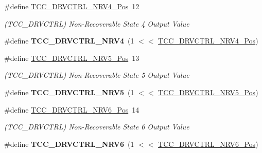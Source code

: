 \begin{DoxyCompactItemize}
\item 
\hypertarget{group___s_a_m_l21___t_c_c_ga3dd9b9c6aa7eabfb0915c9d8ece7ba8a}{}\#define \hyperlink{group___s_a_m_l21___t_c_c_ga3dd9b9c6aa7eabfb0915c9d8ece7ba8a}{T\+C\+C\+\_\+\+D\+R\+V\+C\+T\+R\+L\+\_\+\+N\+R\+V4\+\_\+\+Pos}~12\label{group___s_a_m_l21___t_c_c_ga3dd9b9c6aa7eabfb0915c9d8ece7ba8a}

\begin{DoxyCompactList}\small\item\em (T\+C\+C\+\_\+\+D\+R\+V\+C\+T\+R\+L) Non-\/\+Recoverable State 4 Output Value \end{DoxyCompactList}\item 
\hypertarget{group___s_a_m_l21___t_c_c_ga869b95683d7a2723f8b058ae3cce09b5}{}\#define {\bfseries T\+C\+C\+\_\+\+D\+R\+V\+C\+T\+R\+L\+\_\+\+N\+R\+V4}~(1 $<$$<$ \hyperlink{group___s_a_m_l21___t_c_c_ga3dd9b9c6aa7eabfb0915c9d8ece7ba8a}{T\+C\+C\+\_\+\+D\+R\+V\+C\+T\+R\+L\+\_\+\+N\+R\+V4\+\_\+\+Pos})\label{group___s_a_m_l21___t_c_c_ga869b95683d7a2723f8b058ae3cce09b5}

\item 
\hypertarget{group___s_a_m_l21___t_c_c_gae4467ffcf7ae1223a244a170318411f7}{}\#define \hyperlink{group___s_a_m_l21___t_c_c_gae4467ffcf7ae1223a244a170318411f7}{T\+C\+C\+\_\+\+D\+R\+V\+C\+T\+R\+L\+\_\+\+N\+R\+V5\+\_\+\+Pos}~13\label{group___s_a_m_l21___t_c_c_gae4467ffcf7ae1223a244a170318411f7}

\begin{DoxyCompactList}\small\item\em (T\+C\+C\+\_\+\+D\+R\+V\+C\+T\+R\+L) Non-\/\+Recoverable State 5 Output Value \end{DoxyCompactList}\item 
\hypertarget{group___s_a_m_l21___t_c_c_ga5a7ca6bd387ee52b84da36c2fe1b02c8}{}\#define {\bfseries T\+C\+C\+\_\+\+D\+R\+V\+C\+T\+R\+L\+\_\+\+N\+R\+V5}~(1 $<$$<$ \hyperlink{group___s_a_m_l21___t_c_c_gae4467ffcf7ae1223a244a170318411f7}{T\+C\+C\+\_\+\+D\+R\+V\+C\+T\+R\+L\+\_\+\+N\+R\+V5\+\_\+\+Pos})\label{group___s_a_m_l21___t_c_c_ga5a7ca6bd387ee52b84da36c2fe1b02c8}

\item 
\hypertarget{group___s_a_m_l21___t_c_c_ga865420fb864791a2a25bf02c320b1b13}{}\#define \hyperlink{group___s_a_m_l21___t_c_c_ga865420fb864791a2a25bf02c320b1b13}{T\+C\+C\+\_\+\+D\+R\+V\+C\+T\+R\+L\+\_\+\+N\+R\+V6\+\_\+\+Pos}~14\label{group___s_a_m_l21___t_c_c_ga865420fb864791a2a25bf02c320b1b13}

\begin{DoxyCompactList}\small\item\em (T\+C\+C\+\_\+\+D\+R\+V\+C\+T\+R\+L) Non-\/\+Recoverable State 6 Output Value \end{DoxyCompactList}\item 
\hypertarget{group___s_a_m_l21___t_c_c_gab44096223d19a966c176350b7fb8a47b}{}\#define {\bfseries T\+C\+C\+\_\+\+D\+R\+V\+C\+T\+R\+L\+\_\+\+N\+R\+V6}~(1 $<$$<$ \hyperlink{group___s_a_m_l21___t_c_c_ga865420fb864791a2a25bf02c320b1b13}{T\+C\+C\+\_\+\+D\+R\+V\+C\+T\+R\+L\+\_\+\+N\+R\+V6\+\_\+\+Pos})\label{group___s_a_m_l21___t_c_c_gab44096223d19a966c176350b7fb8a47b}


\end{DoxyCompactItemize}
